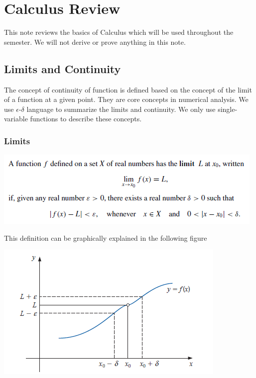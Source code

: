 \documentclass[
]{book}
\begin{document}
\hypertarget{calculus-review}{%
\chapter{Calculus Review}\label{calculus-review}}

This note reviews the basics of Calculus which will be used throughout the semester. We will not derive or prove anything in this note.

\hypertarget{limits-and-continuity}{%
\section{Limits and Continuity}\label{limits-and-continuity}}

The concept of continuity of function is defined based on the concept of the limit of a function at a given point. They are core concepts in numerical analysis. We use \(\epsilon\text{-}\delta\) language to summarize the limits and continuity. We only use single-variable functions to describe these concepts.

\hypertarget{limits}{%
\subsection{Limits}\label{limits}}

\begin{flushleft}\includegraphics[width=0.75\linewidth]{img01/w01-LimitDef} \end{flushleft}

This definition can be graphically explained in the following figure

\begin{center}\includegraphics[width=0.75\linewidth]{img01/w01-LimitDefCurve} \end{center}
\end{document}
